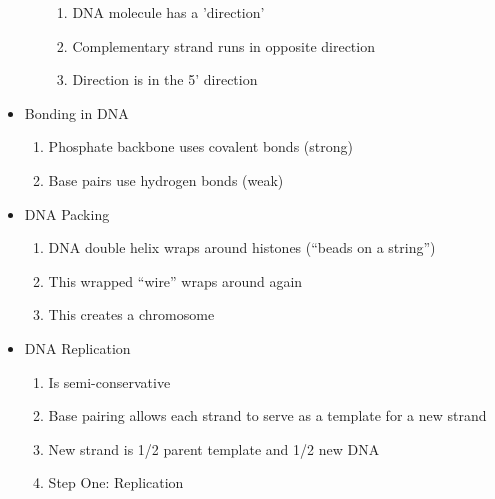 \documentclass[12pt]{article}
\begin{document}
\begin{itemize}
\begin{enumerate}
\begin{enumerate}
          \item DNA molecule has a 'direction'

          \item Complementary strand runs in opposite direction

          \item Direction is in the 5' direction

        \end{enumerate}

    \end{enumerate}

  \item Bonding in DNA

    \begin{enumerate}

      \item Phosphate backbone uses covalent bonds (strong)

      \item Base pairs use hydrogen bonds (weak)

    \end{enumerate}

  \item DNA Packing

    \begin{enumerate}

      \item DNA double helix wraps around histones (``beads on a string'')

      \item This wrapped ``wire'' wraps around again

      \item This creates a chromosome

    \end{enumerate}

  \item DNA Replication

    \begin{enumerate}

      \item Is semi-conservative

      \item Base pairing allows each strand to serve as a template for a new strand

      \item New strand is 1/2 parent template and 1/2 new DNA

      \item Step One: Replication


\end{enumerate}
\end{itemize}
\end{document}
